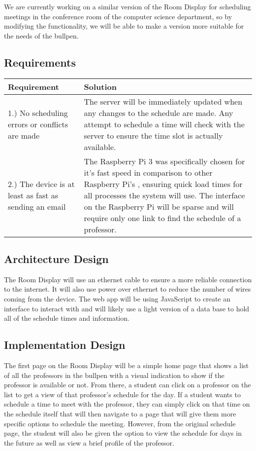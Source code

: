 \documentclass[12pt]{article}
\begin{document}
We are currently working on a similar version of the Room Display for scheduling meetings in the conference room of the computer science department, so by modifying the functionality, we will be able to make a version more suitable for the needs of the bullpen.

\subsection{Requirements}

\begin{center}
\begin{tabular}{| p{7.5cm} | p{7.5cm} |}
\hline
\textbf{Requirement} & \textbf{Solution}\\
\hline
1.) No scheduling errors or conflicts are made & The server will be immediately updated when any changes to the schedule are made. Any attempt to schedule a time will check with the server to ensure the time slot is actually available.\\
\hline
2.) The device is at least as fast as sending an email & The Raspberry Pi 3 was specifically chosen for it's fast speed in comparison to other Raspberry Pi's \cite{picomp}, ensuring quick load times for all processes the system will use. The interface on the Raspberry Pi will be sparse and will require only one link to find the schedule of a professor. \\
\hline
\end{tabular}
\end{center}

\newpage
\subsection{Architecture Design}
The Room Display will use an ethernet cable to ensure a more reliable connection to the internet. It will also use power over ethernet to reduce the number of wires coming from the device. The web app will be using JavaScript to create an interface to interact with and will likely use a light version of a data base to hold all of the schedule times and information.

\subsection{Implementation Design}
The first page on the Room Display will be a simple home page that shows a list of all the professors in the bullpen with a visual indication to show if the professor is available or not. From there, a student can click on a professor on the list to get a view of that professor's schedule for the day. If a student wants to schedule a time to meet with the professor, they can simply click on that time on the schedule itself that will then navigate to a page that will give them more specific options to schedule the meeting. However, from the original schedule page, the student will also be given the option to view the schedule for days in the future as well as view a brief profile of the professor. 
\end{document}
